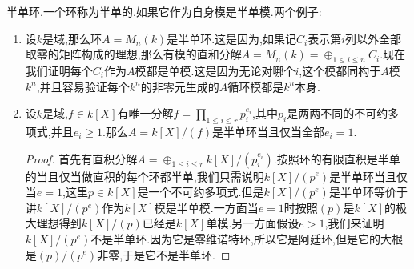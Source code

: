 半单环.一个环称为半单的,如果它作为自身模是半单模.两个例子:
\begin{enumerate}
	\item 设$k$是域,那么环$A=M_n(k)$是半单环.这是因为,如果记$C_i$表示第$i$列以外全部取零的矩阵构成的理想,那么有模的直和分解$A=M_n(k)=\oplus_{1\le i\le n}C_i$.现在我们证明每个$C_i$作为$A$模都是单模.这是因为无论对哪个$i$,这个模都同构于$A$模$k^n$,并且容易验证每个$k^n$的非零元生成的$A$循环模都是$k^n$本身.
	\item 设$k$是域,$f\in k[X]$有唯一分解$f=\prod_{1\le i\le r}p_i^{e_i}$,其中$p_i$是两两不同的不可约多项式,并且$e_i\ge1$.那么$A=k[X]/(f)$是半单环当且仅当全部$e_i=1$.
	\begin{proof}
		
		首先有直积分解$A=\oplus_{1\le i\le r}k[X]/(p_i^{e_i})$.按照环的有限直积是半单的当且仅当做直积的每个环都半单,我们只需说明$k[X]/(p^e)$是半单环当且仅当$e=1$,这里$p\in k[X]$是一个不可约多项式.但是$k[X]/(p^e)$是半单环等价于讲$k[X]/(p^e)$作为$k[X]$模是半单模.一方面当$e=1$时按照$(p)$是$k[X]$的极大理想得到$k[X]/(p)$已经是$k[X]$单模.另一方面假设$e>1$,我们来证明$k[X]/(p^e)$不是半单环.因为它是零维诺特环,所以它是阿廷环,但是它的大根是$(p)/(p^e)$非零,于是它不是半单环.
	\end{proof}
\end{enumerate}

